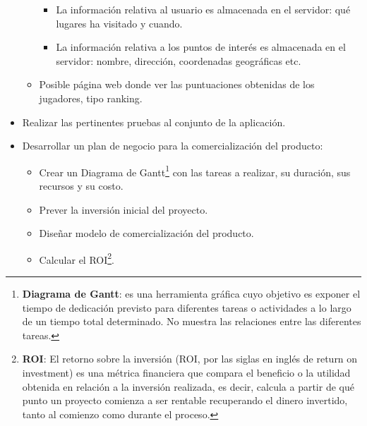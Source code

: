 \documentclass{report}
\begin{document}
\begin{itemize}
\begin{itemize}
\begin{itemize}
        \item La información relativa al usuario es almacenada en el servidor: qué lugares ha visitado y cuando.
        
        \item La información relativa a los puntos de interés es almacenada en el servidor: nombre, dirección, coordenadas geográficas etc.
        
        \end{itemize}
    
    \item Posible página web donde ver las puntuaciones obtenidas de los jugadores, tipo ranking.
    
    \end{itemize}
\item Realizar las pertinentes pruebas al conjunto de la aplicación.

\item Desarrollar un plan de negocio para la comercialización del producto:

    \begin{itemize}
    
    \item Crear un Diagrama de Gantt\footnote{\textbf{Diagrama de Gantt}: es una herramienta gráfica cuyo objetivo es exponer el tiempo de dedicación previsto para diferentes tareas o actividades a lo largo de un tiempo total determinado. No muestra las relaciones entre las diferentes tareas.} con las tareas a realizar, su duración, sus recursos y su costo.
    
    \item Prever la inversión inicial del proyecto.
    
    \item Diseñar modelo de comercialización del producto.
    
    \item Calcular el ROI\footnote{\textbf{ROI}: El retorno sobre la inversión (ROI, por las siglas en inglés de return on investment) es una métrica financiera que compara el beneficio o la utilidad obtenida en relación a la inversión realizada, es decir, calcula a partir de qué punto un proyecto comienza a ser rentable recuperando el dinero invertido, tanto al comienzo como durante el proceso.}.
    
    \end{itemize}
    
\end{itemize}
\end{document}
